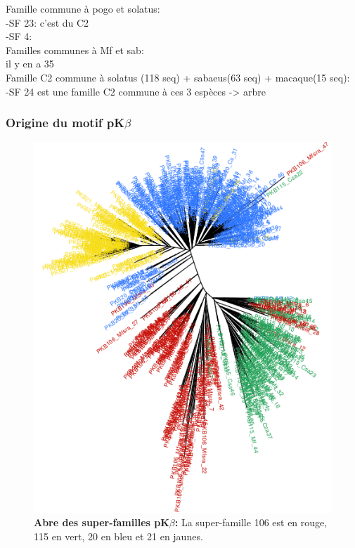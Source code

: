 \documentclass[12pt,a4paper]{article}
\begin{document}
				Famille commune à pogo et solatus:\\
				-SF 23: c'est du C2\\
				-SF 4: \\
				
				Familles communes à Mf et sab:\\
				il y en a 35\\
				
 				Famille C2 commune à solatus (118 seq) + sabaeus(63 seq) + macaque(15 seq):\\
				-SF 24 est une famille C2 commune à ces 3 espèces -> arbre\\
				
				
				
				
			
				
				

	\subsubsection{Origine du motif pK$\beta$}
		\begin{figure}	
			\centering
				\includegraphics[scale=0.4, angle =90]{img/pkb_tree.png}				
				\caption{\textbf{Abre des super-familles pK$\beta$:} La super-famille 106 est en rouge, 115 en vert, 20 en bleu et 21 en jaunes.
	\label{fig:pkb_tree}} 
\end{figure}
\end{document}
